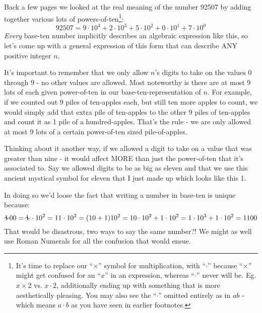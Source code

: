 \documentclass{article}
\begin{document}
Back a few pages we looked at the real meaning
of the number 92507 by adding together
various lots of powers-of-ten\footnote{It's time
to replace our ``$\times{}$'' symbol for multiplication, with ``$\cdot{}$''
because ``$\times{}$'' might get confused for an ``$x$'' in an expression,
whereas ``$\cdot{}$'' never will be. Eg. $x\times{}2$
vs. $x\cdot{}2$, additionally ending up with something that is more aesthetically pleasing.
You may also see the ``$\cdot$'' omitted entirely as
in $ab$ - which means $a\cdot{}b$ as you have seen in earlier footnotes.}:
\[92507=9{\cdot}10^4+2{\cdot}10^3+5{\cdot}10^2+0{\cdot}10^1+7{\cdot}10^0\]
\emph{Every} base-ten number implicitly describes an algebraic expression like this, so
let's come up
with a general expression of this form that can describe ANY positive integer $n$.

It's important to remember that we only allow $n$'s digits
to take on the values 0 through 9 - no other values are allowed.
Most noteworthy is there are at most 9 lots of each given
power-of-ten in our base-ten-representation of $n$.
For example, if we counted out 9 piles of ten-apples each,
but still ten more apples to count,
we would simply add that extra pile of ten-apples
to the other 9 piles of ten-apples and count it as 1 pile of a hundred-apples.
That's the rule - we are only allowed
at most 9 lots of a certain power-of-ten sized pile-of-apples.

Thinking about it another way, if we allowed a digit to take on a value
that was greater than nine - it would affect
MORE than just the power-of-ten that it's associated to.
Say we allowed digits to be as big as eleven and
that we use this ancient mystical symbol for eleven that I just
made up which looks like this {1\hspace{-0.6em}\raisebox{0.05em}{$\sim$}}.

In doing so we'd loose the fact that writing a number in base-ten is unique because:
\[\text{1\hspace{-0.6em}\raisebox{0.05em}{$\sim$}}00 =\text{1\hspace{-0.6em}\raisebox{0.05em}{$\sim$}}\cdot{}10^2 = 11\cdot10^2=(10+1)10^2=10\cdot10^2+1\cdot10^2=1\cdot10^3+1\cdot10^2=1100\]
That would be disastrous, two ways to say the same number?! We might as well use Roman Numerals for all
the confusion that would ensue.
\bigskip
\end{document}
